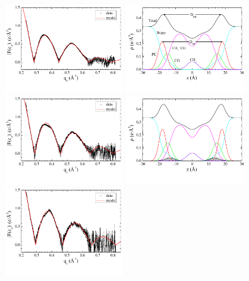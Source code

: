 \begin{figure}[htbp]
  \centering
  \includegraphics[trim=5 30 0 0,clip=true,width=0.47\textwidth]{figures/Tat/SDP_Results/XFF/DOPC_XFF1} 
  \includegraphics[trim=5 30 0 0,clip=true,width=0.47\textwidth]{figures/Tat/SDP_Results/EDP/DOPC_EDP1} 
  \includegraphics[trim=5 30 0 0,clip=true,width=0.47\textwidth]{figures/Tat/SDP_Results/XFF/DOPC_Tat_62to1_3p0_XFF1}
  \includegraphics[trim=5 30 0 0,clip=true,width=0.47\textwidth]{figures/Tat/SDP_Results/EDP/DOPC_Tat_62to1_3p0_EDP1} 
  \includegraphics[trim=5 30 0 0,clip=true,width=0.47\textwidth]{figures/Tat/SDP_Results/XFF/DOPC_Tat_28to1_3p0_XFF1}

\end{figure}
